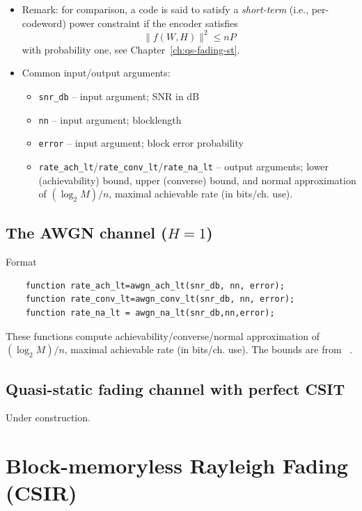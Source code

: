 \documentclass[a4paper,11p]{memoir}
\begin{document}
\begin{itemize}
\item Remark: for comparison, a code is said to satisfy a \emph{short-term}  (i.e., per-codeword) power constraint if the encoder satisfies 
\begin{equation}
\|f(W,H)\|^2 \leq n P 
\end{equation}
with probability one, see Chapter~\ref{ch:qs-fading-st}. 

\item Common input/output arguments:
\begin{itemize}
\item \verb|snr_db| -- input argument; SNR in dB
\item \verb|nn| -- input argument; blocklength
\item \verb|error| -- input argument; block error probability
\item \verb|rate_ach_lt|/\verb|rate_conv_lt|/\verb|rate_na_lt| -- output arguments; lower (achievability) bound, upper (converse) bound, and normal approximation of $(\log_2 M)/n$, maximal achievable rate (in bits/ch. use).

\end{itemize}



\end{itemize}



\section{The AWGN channel ($H=1$)}

Format 

\begin{verbatim}
	function rate_ach_lt=awgn_ach_lt(snr_db, nn, error);
	function rate_conv_lt=awgn_conv_lt(snr_db, nn, error);
	function rate_na_lt = awgn_na_lt(snr_db,nn,error);
\end{verbatim}

These functions compute achievability/converse/normal approximation of $(\log_2 M)/n$, maximal achievable rate (in bits/ch. use). The bounds are from~\cite[Section II.C]{yang15-09} .

\section{Quasi-static fading channel with perfect CSIT}

Under construction.  


\chapter{Block-memoryless Rayleigh Fading (CSIR)}
\end{document}
